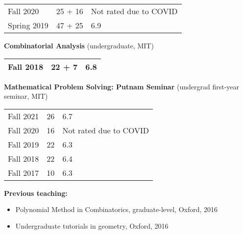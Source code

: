 \documentclass[11pt]{amsart}
\begin{document}
\qquad 
\begin{tabular}[l]{p{2cm}p{3cm}p{3.5cm}}
\toprule
Fall 2020 & 25 + 16 & {\footnotesize Not rated due to COVID} \\
Spring 2019 & 47 + 25 & 6.9 \\
\bottomrule
\end{tabular}

\medskip

\textbf{Combinatorial Analysis} (undergraduate, MIT) 

\qquad 
\begin{tabular}[l]{p{2cm}p{3cm}p{3.5cm}}
\toprule
Fall 2018 & 22 + 7 & 6.8 \\
\bottomrule
\end{tabular}

\medskip

\textbf{Mathematical Problem Solving: Putnam Seminar} (undergrad first-year seminar, MIT) 

\qquad 
\begin{tabular}[l]{p{2cm}p{3cm}p{3.5cm}}
\toprule
Fall 2021 & 26 & 6.7 \\
Fall 2020 & 16 & {\footnotesize Not rated due to COVID} \\
Fall 2019 & 22 & 6.3 \\
Fall 2018 & 22 & 6.4 \\
Fall 2017 & 10 & 6.3 \\
\bottomrule
\end{tabular}


\textbf{Previous teaching:}

\begin{itemize}[topsep=-.5ex,label={},leftmargin=.2in]


\item Polynomial Method in Combinatorics, graduate-level, Oxford, 2016

\item Undergraduate tutorials in geometry, Oxford, 2016
\end{itemize}

%
\end{document}
